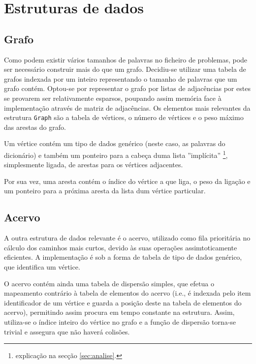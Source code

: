 \documentclass[portuguese, a4paper]{article}
\begin{document}
\section{Estruturas de dados}
	\subsection{Grafo}
	\par
	Como podem existir vários tamanhos de palavras no ficheiro de problemas,
	pode ser necessário construir mais do que um grafo. Decidiu-se utilizar uma
	tabela de grafos indexada por um inteiro representando o tamanho de palavras
	que um grafo contém. Optou-se por representar o grafo por listas de
	adjacências por estes se provarem ser relativamente esparsos, poupando assim
	memória face à implementação através de matriz de adjacências. Os elementos
	mais relevantes da estrutura \texttt{Graph} são a tabela de vértices, o
	número de vértices e o peso máximo das arestas do grafo.
	\par
	Um vértice contém um tipo de dados genérico (neste caso, as palavras do
	dicionário) e também um ponteiro para a cabeça duma lista ''implícita''
	\footnote{explicação na secção \ref{sec:analise}.}, simplesmente ligada, de
	arestas para os vértices adjacentes.
	\par
	Por sua vez, uma aresta contém o índice do vértice a que liga, o peso da
	ligação e um ponteiro para a próxima aresta da lista dum vértice
	particular.

	\subsection{Acervo}
	\par\null\par
	A outra estrutura de dados relevante é o acervo, utilizado como fila
	prioritária no cálculo dos caminhos mais curtos, devido às suas operações
	assimtoticamente eficientes. A implementação é sob a forma de tabela de tipo
	de dados genérico, que identifica um vértice.
	\par
	O acervo contém ainda uma tabela de dispersão simples, que efetua o
	mapeamento contrário à tabela de elementos do acervo (i.e., é indexada pelo
	item identificador de um vértice e guarda a posição deste na tabela de
	elementos do acervo), permitindo assim procura em tempo constante na
	estrutura. Assim, utiliza-se o índice inteiro do vértice no grafo e a função
	de dispersão torna-se trivial e assegura que não haverá colisões.
\end{document}
